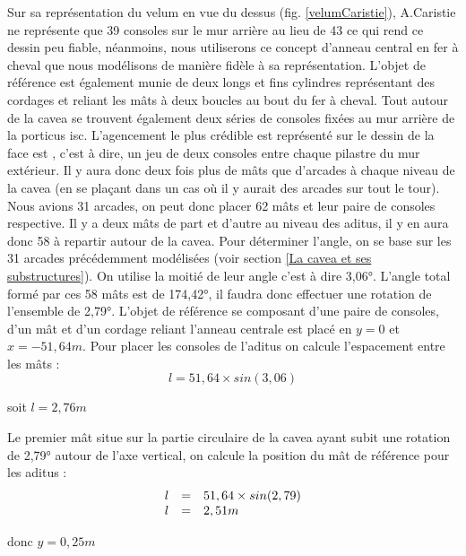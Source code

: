 Sur sa représentation du velum en vue du dessus  (fig. \ref{velumCaristie}), A.Caristie ne représente que 39 consoles sur le mur arrière au lieu de 43 ce qui rend ce dessin peu fiable, néanmoins, nous utiliserons ce concept d'anneau central en fer à cheval que nous modélisons de manière fidèle à sa représentation. L'objet de référence est également munie de deux longs et fins cylindres représentant des cordages et reliant les mâts à deux boucles au bout du fer à cheval.
Tout autour de la cavea se trouvent également deux séries de consoles fixées au mur arrière de la \gls{porticus isc}. L'agencement le plus crédible est représenté sur le dessin de la face est \cite[Pl. IV]{orangePl}, c'est à dire, un jeu de deux consoles entre chaque \gls{pilastre} du mur extérieur. Il y aura donc deux fois plus de mâts que d'arcades à chaque niveau de la cavea (en se plaçant dans un cas où il y aurait des arcades sur tout le tour). Nous avions 31 arcades, on peut donc placer 62 mâts et leur paire de consoles respective. Il y a deux mâts de part et d'autre au niveau des aditus, il y en aura donc 58 à repartir autour de la cavea. Pour déterminer l'angle, on se base sur les 31 arcades précédemment modélisées (voir section \ref{La cavea et ses substructures}). On utilise la moitié de leur angle c'est à dire 3,06°. L'angle total formé par ces 58 mâts est de 174,42°, il faudra donc effectuer une rotation de l'ensemble de 2,79°. L'objet de référence se composant d'une paire de consoles, d'un mât et d'un cordage reliant l'anneau centrale est placé en $y=0$ et $x=-51,64m$. Pour placer les consoles de l'aditus on calcule l'espacement entre les mâts :
\begin{equation}
	l =  51,64 \times sin(3,06) 
\end{equation}
\begin{center}
	soit $l = 2,76m$
\end{center}

Le premier mât situe sur la partie circulaire de la cavea ayant subit une rotation de 2,79° autour de l'axe vertical, on calcule la position du mât de référence pour les aditus :
\begin{equation}
	\begin{array}{r c l}
		l & = & 51,64 \times sin(2,79) \\
		l &= & 2,51m
	\end{array}
\end{equation}
\begin{center}
	donc $y = 0,25m$
\end{center}

